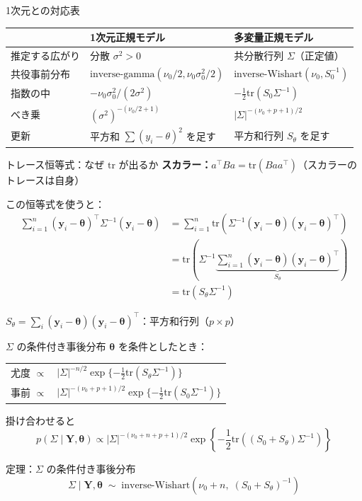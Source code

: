\documentclass[lualatex,aspectratio=169,12pt]{beamer}
\newcommand{\IW}{\mathrm{inverse\text{-}Wishart}}
\newcommand{\IG}{\mathrm{inverse\text{-}gamma}}
\newcommand{\tr}{\mathrm{tr}}
\begin{document}
\begin{frame}{1次元との対応表}
  \begin{center}
  \renewcommand{\arraystretch}{1.6}
  \begin{tabular}{lll}
  \toprule
   & 1次元正規モデル & 多変量正規モデル \\
  \midrule
  推定する広がり & 分散 $\sigma^2 > 0$ & 共分散行列 $\Sigma$（正定値）\\
  共役事前分布 & $\IG(\nu_0/2, \nu_0\sigma_0^2/2)$ & $\IW(\nu_0, S_0^{-1})$ \\
  指数の中 & $-\nu_0\sigma_0^2/(2\sigma^2)$ & $-\frac12\tr(S_0\Sigma^{-1})$ \\
  べき乗 & $(\sigma^2)^{-(\nu_0/2+1)}$ & $|\Sigma|^{-(\nu_0+p+1)/2}$ \\
  更新 & 平方和 $\sum(y_i-\theta)^2$ を足す & 平方和行列 $S_\theta$ を足す \\
  \bottomrule
  \end{tabular}
  \end{center}
\end{frame}

\begin{frame}{トレース恒等式：なぜ $\tr$ が出るか}
  \textbf{スカラー：}$a^\top B a = \tr(Baa^\top)$（スカラーのトレースは自身）

  \bigskip
  この恒等式を使うと：
  \begin{align*}
    \sum_{i=1}^n (\bm{y}_i-\bm{\theta})^\top\Sigma^{-1}(\bm{y}_i-\bm{\theta})
    &= \sum_{i=1}^n \tr\!\left(\Sigma^{-1}(\bm{y}_i-\bm{\theta})(\bm{y}_i-\bm{\theta})^\top\right) \\
    &= \tr\!\left(\Sigma^{-1}\underbrace{\sum_{i=1}^n(\bm{y}_i-\bm{\theta})(\bm{y}_i-\bm{\theta})^\top}_{S_\theta}\right) \\
    &= \tr(S_\theta\Sigma^{-1})
  \end{align*}

  \vspace{0.3em}
  $S_\theta = \sum_i(\bm{y}_i-\bm{\theta})(\bm{y}_i-\bm{\theta})^\top$：\alert{平方和行列}（$p\times p$）
\end{frame}

\begin{frame}{$\Sigma$ の条件付き事後分布}
  $\bm{\theta}$ を条件としたとき：

  \bigskip
  \begin{tabular}{rl}
    尤度 $\propto$ & $|\Sigma|^{-n/2}\exp\{-\frac12\tr(S_\theta\Sigma^{-1})\}$ \\[4pt]
    事前 $\propto$ & $|\Sigma|^{-(\nu_0+p+1)/2}\exp\{-\frac12\tr(S_0\Sigma^{-1})\}$ \\
  \end{tabular}

  \bigskip
  掛け合わせると
  \[
    p(\Sigma\mid\bm{Y},\bm{\theta})
    \propto |\Sigma|^{-(\nu_0+n+p+1)/2}\exp\!\left\{-\frac12\tr\!\left((S_0+S_\theta)\Sigma^{-1}\right)\right\}
  \]

  \begin{block}{定理：$\Sigma$ の条件付き事後分布}
    \[
      \Sigma \mid \bm{Y}, \bm{\theta}
      \;\sim\; \IW\!\left(\nu_0+n,\; (S_0 + S_\theta)^{-1}\right)
    \]
  \end{block}
\end{frame}
\end{document}

